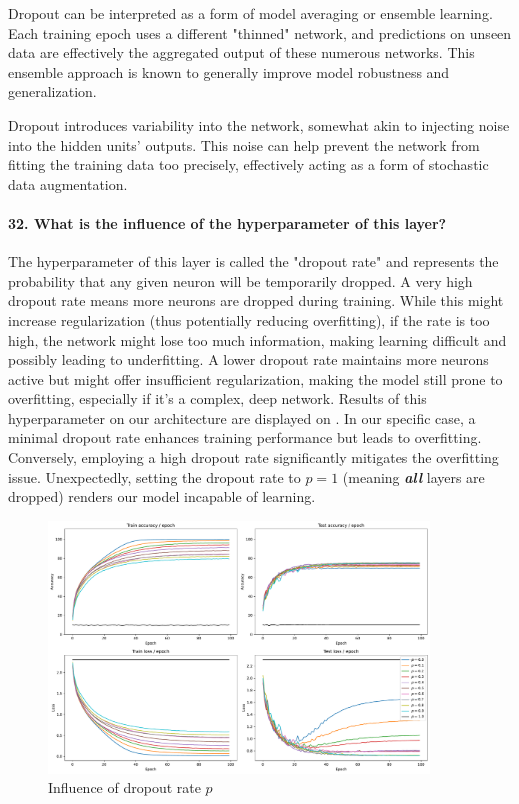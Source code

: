 Dropout can be interpreted as a form of model averaging or ensemble learning. Each training epoch uses a different "thinned" network, and predictions on unseen data are effectively the aggregated output of these numerous networks. This ensemble approach is known to generally improve model robustness and generalization.

Dropout introduces variability into the network, somewhat akin to injecting noise into the hidden units' outputs. This noise can help prevent the network from fitting the training data too precisely, effectively acting as a form of stochastic data augmentation.

\paragraph{32. What is the influence of the hyperparameter of this layer?}
The hyperparameter of this layer is called the "dropout rate" and represents the probability that any given neuron will be temporarily dropped. A very high dropout rate means more neurons are dropped during training. While this might increase regularization (thus potentially reducing overfitting), if the rate is too high, the network might lose too much information, making learning difficult and possibly leading to underfitting. A lower dropout rate maintains more neurons active but might offer insufficient regularization, making the model still prone to overfitting, especially if it's a complex, deep network. Results of this hyperparameter on our architecture are displayed on . In our specific case, a minimal dropout rate enhances training performance but leads to overfitting. Conversely, employing a high dropout rate significantly mitigates the overfitting issue. Unexpectedly, setting the dropout rate to $p=1$ (meaning \textbf{\textit{all}} layers are dropped) renders our model incapable of learning.

\begin{figure}[H]
    \centering
    \includegraphics*[width=0.9\textwidth]{figs/CNN/dropout_hyperparameter.pdf}
    \caption{Influence of dropout rate $p$}
    \label{fig:dropout_hyperparameter}
\end{figure}

